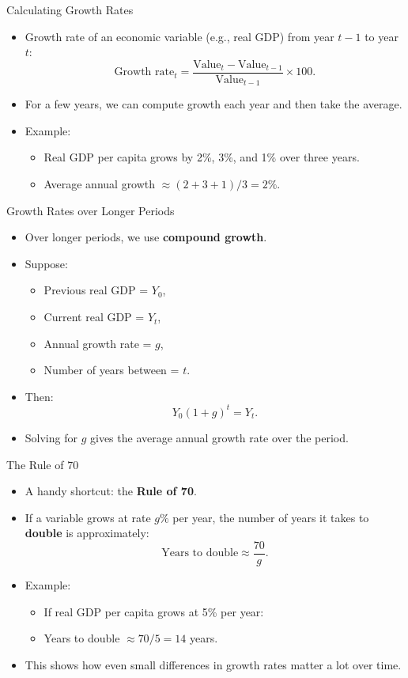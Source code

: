 \documentclass[aspectratio=169]{beamer}
\begin{document}
\begin{frame}{Calculating Growth Rates}
\transfade
\begin{itemize}
  \item Growth rate of an economic variable (e.g., real GDP) from year \(t-1\) to year \(t\):
  \[
    \text{Growth rate}_t =
    \frac{\text{Value}_t - \text{Value}_{t-1}}{\text{Value}_{t-1}} \times 100.
  \]
  \item For a few years, we can compute growth each year and then take the average.
  \item Example:
  \begin{itemize}
    \item Real GDP per capita grows by 2\%, 3\%, and 1\% over three years.
    \item Average annual growth \(\approx (2 + 3 + 1)/3 = 2\%\).
  \end{itemize}
\end{itemize}
\end{frame}

\begin{frame}{Growth Rates over Longer Periods}
\transfade
\begin{itemize}
  \item Over longer periods, we use \textbf{compound growth}.
  \item Suppose:
  \begin{itemize}
    \item Previous real GDP = \(Y_0\),
    \item Current real GDP = \(Y_t\),
    \item Annual growth rate = \(g\),
    \item Number of years between = \(t\).
  \end{itemize}
  \item Then:
  \[
    Y_0 (1 + g)^t = Y_t.
  \]
  \item Solving for \(g\) gives the average annual growth rate over the period.
\end{itemize}
\end{frame}

\begin{frame}{The Rule of 70}
\transfade
\begin{itemize}
  \item A handy shortcut: the \textbf{Rule of 70}.
  \item If a variable grows at rate \(g\%\) per year, the number of years it takes to \textbf{double} is approximately:
  \[
    \text{Years to double} \approx \frac{70}{g}.
  \]
  \item Example:
  \begin{itemize}
    \item If real GDP per capita grows at 5\% per year:
    \item Years to double \(\approx 70 / 5 = 14\) years.
  \end{itemize}
  \item This shows how even small differences in growth rates matter a lot over time.
\end{itemize}
\end{frame}
\end{document}
